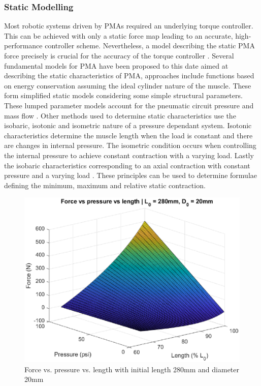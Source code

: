 \documentclass[11pt,a4paper]{article}
\begin{document}
\subsubsection{Static Modelling}
\label{sub:static_modelling}
Most robotic systems driven by PMAs required an underlying torque controller. This can be achieved with only a static force map leading to an accurate, high-performance controller scheme. Nevertheless, a model describing the static PMA force precisely is crucial for the accuracy of the torque controller \cite{martens_boblan_2017}. Several fundamental models for PMA have been proposed to this date aimed at describing the static characteristics of PMA, approaches include functions based on energy conservation assuming the ideal cylinder nature of the muscle. These form simplified static models considering some simple structural parameters. These lumped parameter models account for the pneumatic circuit pressure and mass flow \cite{chou_hannaford_1996}. Other methods used to determine static characteristics use the isobaric, isotonic and isometric nature of a pressure dependant system. Isotonic characteristics determine the muscle length when the load is constant and there are changes in internal pressure. The isometric condition occurs when controlling the internal pressure to achieve constant contraction with a varying load. Lastly the isobaric characteristics corresponding to an axial contraction with constant pressure and a varying load \cite{takosoglu_laski_blasiak_bracha_pietrala_2016}. These principles can be used to determine formulae defining the minimum, maximum and relative static contraction. \newline

\begin{figure}[hbt!]
    \centering
    \includegraphics[scale=0.8]{staticmap.eps}
    \caption{Force vs. pressure vs. length with initial length 280mm and diameter 20mm}
    \label{fig:staticmap}
\end{figure}
\end{document}
